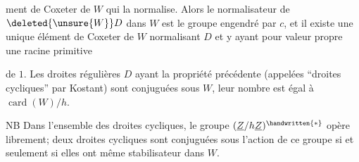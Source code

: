 ment de Coxeter de $W$ qui la normalise. Alors le normalisateur de $\deleted{\unsure{W}}D$ dans $W$ est le groupe engendré par $c$, et il existe une unique élément de Coxeter de $W$ normalisant $D$ et y ayant pour valeur propre une racine primitive  de $1$. Les droites régulières $D$ ayant la propriété précédente (appelées ``droites cycliques'' par Kostant) sont conjuguées sous $W$, leur nombre est égal à $\operatorname{card}(W)/h$.

NB Dans l'ensemble des droites cycliques, le groupe $(\underline{Z}/h\underline{Z})^{\handwritten{*}}$ opère librement; deux droites cycliques sont conjuguées sous l'action de ce groupe si et seulement si elles ont même stabilisateur dans $W$.

